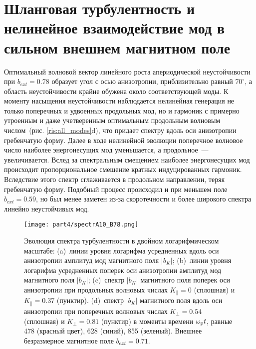 \section{Шланговая турбулентность и нелинейное взаимодействие мод в сильном внешнем магнитном поле}
\label{part_spectr_b78}

Оптимальный волновой вектор линейного роста апериодической неустойчивости при  $b_{ext}=0.78$ образует угол с осью анизотропии, приблизительно равный  $70^\circ$, а область неустойчивости крайне обужена около соответствующей моды. К моменту насыщения неустойчивости наблюдается нелинейная генерация не только поперечных и удвоенных продольных мод, но и гармоник с примерно утроенным и даже учетверенным оптимальным продольным волновым числом~(рис. \ref{ris:all_modes}d), что придает спектру вдоль оси анизотропии гребенчатую форму. Далее в ходе нелинейной эволюции поперечное волновое число наиболее энергонесущих мод уменьшается, а продольное~--- увеличивается. Вслед за спектральным смещением наиболее энергонесущих мод происходит пропорциональное смещение кратных индуцированных гармоник. Вследствие этого спектр сглаживается в продольном направлении, теряя гребенчатую форму. Подобный процесс происходил и при меньшем поле $b_{ext}=0.59$, но был менее заметен из-за скоротечности и более широкого спектра линейно неустойчивых мод.

\begin{figure}[h!]

\texttt{[image: part4/spectrA10\_B78.png]}
\caption{Эволюция спектра турбулентности в двойном логарифмическом масштабе: (a)~линии уровня логарифма усредненных вдоль оси анизотропии амплитуд мод магнитного поля $|b_K|$; 
(b)~линии уровня логарифма усредненных поперек оси анизотропии амплитуд мод магнитного поля $|b_K|$; 
(c)~спектр $|b_K|$ магнитного поля поперек оси анизотропии при продольных волновых числах $K_\|=0$ (сплошная) и $K_\|=0.37$ (пунктир). 
(d)~спектр $|b_K|$ магнитного поля вдоль оси анизотропии при поперечных волновых числах $K_\perp=0.54$ (сплошная) и $K_\perp=0.81$ (пунктир) в моменты времени $\omega_\mathrm{p} t$, равные 478 (красный цвет), 628 (синий), 855 (зеленый). Внешнее безразмерное магнитное поле $b_{ext}=0.71$.
}
\label{ris:spectrA10_B78}
\end{figure}


